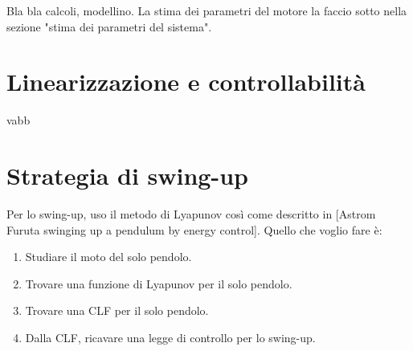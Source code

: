 Bla bla calcoli, modellino.
La stima dei parametri del motore la faccio sotto nella sezione "stima dei parametri del sistema".





\section{Linearizzazione e controllabilità}
vabb





\section{Strategia di swing-up}
Per lo swing-up, uso il metodo di Lyapunov così come descritto in [Astrom Furuta swinging up a pendulum by energy control]. 
Quello che voglio fare è:

\begin{enumerate}
    \item Studiare il moto del solo pendolo.
    \item Trovare una funzione di Lyapunov per il solo pendolo.
    \item Trovare una CLF per il solo pendolo.
    \item Dalla CLF, ricavare una legge di controllo per lo swing-up.
\end{enumerate}

